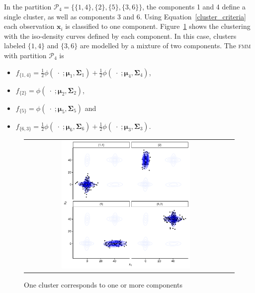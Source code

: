 \documentclass[submit]{smj}
\theoremstyle{definition}
\newcommand{\m}[1]{\boldsymbol{#1}}
\newcommand{\fmm}{\textsc{fmm}\xspace}
\begin{document}
In the partition $\mathcal{P}_4 = \{ \{1, 4\},\{2\}, \{5\}, \{3, 6\} \}$, the components 1 and 4 define a single cluster, as well as components 3 and 6. Using Equation~\ref{cluster_criteria} each observation $\m x_i$ is classified to one component. Figure~\ref{ex_two_one} shows the clustering with the iso-density curves defined by each component. In this case, clusters labeled $\{1,4\}$ and $\{3, 6\}$ are modelled by a mixture of two components. The \fmm with partition $\mathcal{P}_4$ is
\begin{itemize}
\item $f_{\{1,4\}} = \frac{1}{2} \phi(\;\cdot\; ;  \m\mu_1, \m\Sigma_1) + \frac{1}{2} \phi(\;\cdot\; ;  \m\mu_4, \m\Sigma_4)$, 
\item $f_{\{2\}} = \phi(\;\cdot\; ;  \m\mu_2, \m\Sigma_2)$, 
\item $f_{\{5\}} = \phi(\;\cdot\; ;  \m\mu_5, \m\Sigma_5)$ and
\item $f_{\{6,3\}} = \frac{1}{2} \phi(\;\cdot\; ;  \m\mu_6, \m\Sigma_6) + \frac{1}{2} \phi(\;\cdot\; ;  \m\mu_3, \m\Sigma_3)$.
\end{itemize}

\begin{figure}[h]
\begin{center}
\begin{tabular}{cc}
  \includegraphics[width=0.65\textwidth]{figures/partition-example-part4.pdf} \\
 \end{tabular}
 \caption{One cluster corresponds to one or more components}\label{ex_two_one}
\end{center}
\end{figure}
\end{document}
